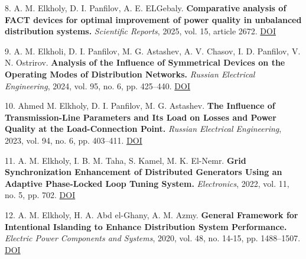 \documentclass[10pt,a4paper]{article}
\begin{document}
8. A. M. Elkholy, D. I. Panfilov, A. E. ELGebaly. \textbf{Comparative analysis of FACT devices for optimal improvement of power quality in unbalanced distribution systems.} \textit{Scientific Reports}, 2025, vol. 15, article 2672. \href{https://doi.org/10.1038/s41598-024-57331-4}{DOI}\par
9. A. M. Elkholi, D. I. Panfilov, M. G. Astashev, A. V. Chasov, I. D. Panfilov, V. N. Ostrirov. \textbf{Analysis of the Influence of Symmetrical Devices on the Operating Modes of Distribution Networks.} \textit{Russian Electrical Engineering}, 2024, vol. 95, no. 6, pp. 425–440. \href{https://doi.org/10.3103/s1068371224700470}{DOI}\par
10.  Ahmed M. Elkholy, D. I. Panfilov, M. G. Astashev. \textbf{The Influence of Transmission-Line Parameters and Its Load on Losses and Power Quality at the Load-Connection Point.} \textit{Russian Electrical Engineering}, 2023, vol. 94, no. 6, pp. 403–411. \href{https://doi.org/10.3103/s1068371223060044}{DOI}\par
11. A. M. Elkholy, I. B. M. Taha, S. Kamel, M. K. El-Nemr. \textbf{Grid Synchronization Enhancement of Distributed Generators Using an Adaptive Phase-Locked Loop Tuning System.} \textit{Electronics}, 2022, vol. 11, no. 5, pp. 702. \href{https://doi.org/10.3390/electronics11050702}{DOI}\par
12. A. M. Elkholy, H. A. Abd el-Ghany, A. M. Azmy. \textbf{General Framework for Intentional Islanding to Enhance Distribution System Performance.} \textit{Electric Power Components and Systems}, 2020, vol. 48, no. 14-15, pp. 1488–1507. \href{https://doi.org/10.1080/15325008.2020.1856227}{DOI}\par
\newpage
\end{document}
